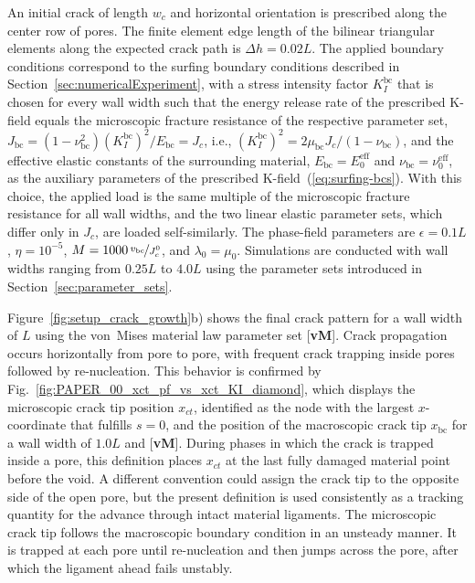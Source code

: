 \documentclass[pdflatex,sn-mathphys-num]{sn-jnl}%
\newcommand{\vMLabel}{[\textbf{vM}]\xspace}
\theoremstyle{thmstyleone}%
\theoremstyle{thmstyletwo}%
\theoremstyle{thmstylethree}%
\begin{document}
An initial crack of length $w_c$ and horizontal orientation is prescribed along the center row of pores. The finite element edge length of the bilinear triangular elements along the expected crack path is $\Delta h = 0.02L$. The applied boundary conditions correspond to the surfing boundary conditions described in Section~\ref{sec:numericalExperiment}, with a stress intensity factor $K_I^{\text{bc}}$ that is chosen for every wall width such that the energy release rate of the prescribed K-field equals the microscopic fracture resistance of the respective parameter set, $J_{\text{bc}} = (1-\nu_{\text{bc}}^2)(K_I^{\text{bc}})^2/E_{\text{bc}} = J_c$, i.e., $(K_I^{\text{bc}})^2 = 2\mu_{\text{bc}}J_c/(1-\nu_{\text{bc}})$, and the effective elastic constants of the surrounding material, $E_{\text{bc}} = E_0^{\text{eff}}$ and $\nu_{\text{bc}} = \nu_0^{\text{eff}}$, as the auxiliary parameters of the prescribed K-field~(\ref{eq:surfing-bcs}). With this choice, the applied load is the same multiple of the microscopic fracture resistance for all wall widths, and the two linear elastic parameter sets, which differ only in $J_c$, are loaded self-similarly. The phase-field parameters are $\epsilon = 0.1L$, $\eta = 10^{-5}$, $M = 1000\,\nicefrac{v_{\text{bc}}}{J_c^0}$, and $\lambda_0 = \mu_0$. Simulations are conducted with wall widths ranging from $0.25L$ to $4.0L$ using the parameter sets introduced in Section~\ref{sec:parameter_sets}.

Figure~\ref{fig:setup_crack_growth}b) shows the final crack pattern for a wall width of $L$ using the von~Mises material law parameter set \vMLabel. Crack propagation occurs horizontally from pore to pore, with frequent crack trapping inside pores followed by re-nucleation. This behavior is confirmed by Fig.~\ref{fig:PAPER_00_xct_pf_vs_xct_KI_diamond}, which displays the microscopic crack tip position $x_{ct}$, identified as the node with the largest $x$-coordinate that fulfills $s=0$, and the position of the macroscopic crack tip $x_{\text{bc}}$ for a wall width of $1.0L$ and \vMLabel. During phases in which the crack is trapped inside a pore, this definition places $x_{ct}$ at the last fully damaged material point before the void. A different convention could assign the crack tip to the opposite side of the open pore, but the present definition is used consistently as a tracking quantity for the advance through intact material ligaments. The microscopic crack tip follows the macroscopic boundary condition in an unsteady manner. It is trapped at each pore until re-nucleation and then jumps across the pore, after which the ligament ahead fails unstably.
\end{document}
